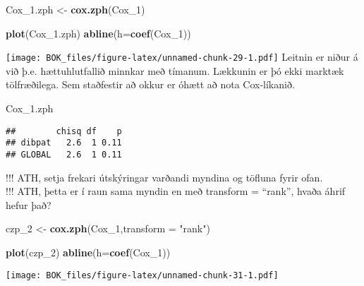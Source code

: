 \documentclass[
]{book}
\newenvironment{Shaded}{\begin{snugshade}}{\end{snugshade}}
\newcommand{\DataTypeTok}[1]{\textcolor[rgb]{0.13,0.29,0.53}{#1}}
\newcommand{\DecValTok}[1]{\textcolor[rgb]{0.00,0.00,0.81}{#1}}
\newcommand{\FloatTok}[1]{\textcolor[rgb]{0.00,0.00,0.81}{#1}}
\newcommand{\KeywordTok}[1]{\textcolor[rgb]{0.13,0.29,0.53}{\textbf{#1}}}
\newcommand{\NormalTok}[1]{#1}
\newcommand{\StringTok}[1]{\textcolor[rgb]{0.31,0.60,0.02}{#1}}
\begin{document}
\begin{Shaded}
\begin{Highlighting}[]
\NormalTok{Cox\_}\FloatTok{1.}\NormalTok{zph <{-}}\StringTok{ }\KeywordTok{cox.zph}\NormalTok{(Cox\_}\DecValTok{1}\NormalTok{)}
\end{Highlighting}
\end{Shaded}

\begin{Shaded}
\begin{Highlighting}[]
\KeywordTok{plot}\NormalTok{(Cox\_}\FloatTok{1.}\NormalTok{zph)}
\KeywordTok{abline}\NormalTok{(}\DataTypeTok{h=}\KeywordTok{coef}\NormalTok{(Cox\_}\DecValTok{1}\NormalTok{))}
\end{Highlighting}
\end{Shaded}

\texttt{[image: BOK\_files/figure-latex/unnamed-chunk-29-1.pdf]}
Leitnin er niður á við þ.e. hættuhlutfallið minnkar með tímanum. Lækkunin er þó ekki marktæk tölfræðilega. Sem staðfestir að okkur er óhætt að nota Cox-líkanið.

\begin{Shaded}
\begin{Highlighting}[]
\NormalTok{Cox\_}\FloatTok{1.}\NormalTok{zph}
\end{Highlighting}
\end{Shaded}

\begin{verbatim}
##        chisq df    p
## dibpat   2.6  1 0.11
## GLOBAL   2.6  1 0.11
\end{verbatim}

!!! ATH, setja frekari útskýringar varðandi myndina og töfluna fyrir ofan.\\
!!! ATH, þetta er í raun sama myndin en með transform = ``rank'', hvaða áhrif hefur það?

\begin{Shaded}
\begin{Highlighting}[]
\NormalTok{czp\_}\DecValTok{2}\NormalTok{ <{-}}\StringTok{ }\KeywordTok{cox.zph}\NormalTok{(Cox\_}\DecValTok{1}\NormalTok{,}\DataTypeTok{transform =} \StringTok{"rank"}\NormalTok{)}

\KeywordTok{plot}\NormalTok{(czp\_}\DecValTok{2}\NormalTok{)}
\KeywordTok{abline}\NormalTok{(}\DataTypeTok{h=}\KeywordTok{coef}\NormalTok{(Cox\_}\DecValTok{1}\NormalTok{))}
\end{Highlighting}
\end{Shaded}

\texttt{[image: BOK\_files/figure-latex/unnamed-chunk-31-1.pdf]}
\end{document}

